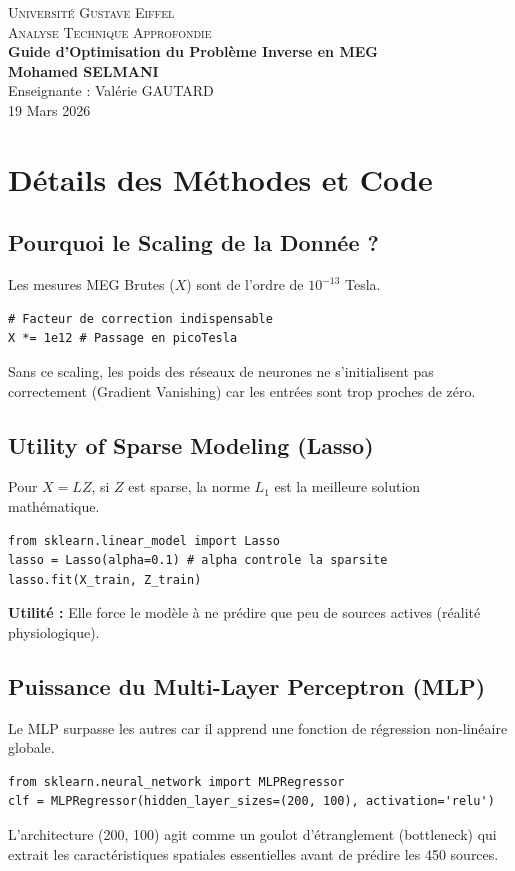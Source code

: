 \documentclass[a4paper,12pt,oneside]{report}
\begin{document}
\begin{titlepage}
    \centering
    \textsc{\LARGE Université Gustave Eiffel}\\[1cm]
    \textsc{\Large Analyse Technique Approfondie}\\[1.5cm]
    {\huge \bfseries Guide d'Optimisation du Problème Inverse en MEG }\\[1cm]
    {\Large \bfseries Mohamed SELMANI}\\[0.5cm]
    {\large Enseignante : Valérie GAUTARD}\\[2cm]
    \vfill
    {\large 19 Mars 2026}
\end{titlepage}

\chapter{Détails des Méthodes et Code}

\section{Pourquoi le Scaling de la Donnée ?}
Les mesures MEG Brutes ($X$) sont de l'ordre de $10^{-13}$ Tesla.
\begin{lstlisting}[caption=Scaling indispensable]
# Facteur de correction indispensable
X *= 1e12 # Passage en picoTesla
\end{lstlisting}
Sans ce scaling, les poids des réseaux de neurones ne s'initialisent pas correctement (Gradient Vanishing) car les entrées sont trop proches de zéro.

\section{Utility of Sparse Modeling (Lasso)}
Pour $X = LZ$, si $Z$ est sparse, la norme $L_1$ est la meilleure solution mathématique.
\begin{lstlisting}[caption=Lasso via Scikit-Learn]
from sklearn.linear_model import Lasso
lasso = Lasso(alpha=0.1) # alpha controle la sparsite
lasso.fit(X_train, Z_train)
\end{lstlisting}
\textbf{Utilité :} Elle force le modèle à ne prédire que peu de sources actives (réalité physiologique).

\section{Puissance du Multi-Layer Perceptron (MLP)}
Le MLP surpasse les autres car il apprend une fonction de régression non-linéaire globale.
\begin{lstlisting}[caption=Détail du modèle MLP]
from sklearn.neural_network import MLPRegressor
clf = MLPRegressor(hidden_layer_sizes=(200, 100), activation='relu')
\end{lstlisting}
L'architecture (200, 100) agit comme un goulot d'étranglement (bottleneck) qui extrait les caractéristiques spatiales essentielles avant de prédire les 450 sources.
\end{document}
